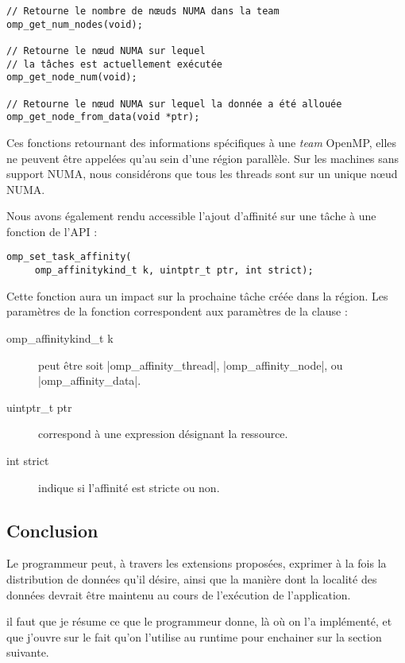 \begin{lstlisting}
// Retourne le nombre de nœuds NUMA dans la team
omp_get_num_nodes(void);

// Retourne le nœud NUMA sur lequel
// la tâches est actuellement exécutée
omp_get_node_num(void);

// Retourne le nœud NUMA sur lequel la donnée a été allouée
omp_get_node_from_data(void *ptr);
\end{lstlisting}

Ces fonctions retournant des informations spécifiques à une \emph{team} OpenMP, elles ne peuvent être appelées qu'au sein d'une région parallèle.
Sur les machines sans support NUMA, nous considérons que tous les threads sont sur un unique nœud NUMA.

Nous avons également rendu accessible l'ajout d'affinité sur une tâche à une fonction de l'API :
\begin{lstlisting}
omp_set_task_affinity( 
     omp_affinitykind_t k, uintptr_t ptr, int strict);
\end{lstlisting}
Cette fonction aura un impact sur la prochaine tâche créée dans la région.
Les paramètres de la fonction correspondent aux paramètres de la clause :

\begin{description}
  \item [omp\_affinitykind\_t k] peut être soit |omp_affinity_thread|, |omp_affinity_node|, ou |omp_affinity_data|.
  \item [uintptr\_t ptr] correspond à une expression désignant la ressource.
  \item [int strict] indique si l'affinité est stricte ou non.
\end{description}


\subsection*{Conclusion}

Le programmeur peut, à travers les extensions proposées, exprimer à la fois la distribution de données qu'il désire, ainsi que la manière dont la localité des données devrait être maintenu au cours de l'exécution de l'application.

\begin{todo}
  il faut que je résume ce que le programmeur donne, là où on l'a implémenté, et que j'ouvre sur le fait qu'on l'utilise au runtime pour enchainer sur la section suivante.
\end{todo}





